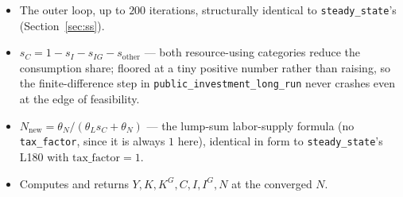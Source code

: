 \documentclass[11pt]{article}
\begin{document}
\begin{itemize}
\item[\textbf{L570--L580}] The outer loop, up to $200$ iterations,
structurally identical to \texttt{steady\_state}'s (Section~\ref{sec:ss}).
\item[\textbf{L572--L575}] $s_C=1-s_I-s_{IG}-s_{\text{other}}$ --- both
resource-using categories reduce the consumption share; floored at a tiny
positive number rather than raising, so the finite-difference step in
\texttt{public\_investment\_long\_run} never crashes even at the edge of
feasibility.
\item[\textbf{L576}] $N_{\text{new}}=\theta_N/(\theta_L s_C+\theta_N)$ ---
the lump-sum labor-supply formula (no \texttt{tax\_factor}, since it is
always $1$ here), identical in form to \texttt{steady\_state}'s L180 with
$\text{tax\_factor}=1$.
\item[\textbf{L581--L587}] Computes and returns $Y,K,K^G,C,I,I^G,N$ at the
converged $N$.
\end{itemize}
\end{document}
